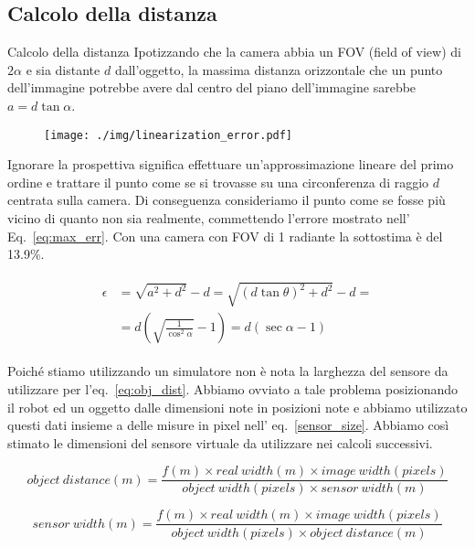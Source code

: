 \documentclass[10pt]{beamer}
\begin{document}
	\subsection{Calcolo della distanza}\label{subsec:Calcolo-della-distanza}
	\begin{frame}[allowframebreaks]{Calcolo della distanza}
		Ipotizzando che la camera abbia un FOV (field of view) di
		$2\alpha$ e sia distante $d$ dall'oggetto, la massima distanza
		orizzontale che un punto dell'immagine potrebbe avere dal centro del
		piano dell'immagine sarebbe $a = d \tan \alpha$.
		
		\begin{figure}[H]
			\centering
			\texttt{[image: ./img/linearization\_error.pdf]}
		\end{figure}
		
		Ignorare la prospettiva significa effettuare un'approssimazione lineare
		del primo ordine e trattare il punto come se si trovasse su una
		circonferenza di raggio $d$ centrata sulla camera. Di conseguenza
		consideriamo il punto come se fosse più vicino di quanto non sia
		realmente, commettendo l'errore mostrato nell' Eq.~\ref{eq:max_err}.
		Con una camera con FOV di 1 radiante la sottostima è del 13.9\%.
		
		\begin{gather}
		\begin{aligned}
		\epsilon &= 
		\sqrt{a^2+d^2} - d =
		\sqrt{(d\tan \theta )^2+d^2}-d =\\
		&=d\left( \sqrt{\frac{1}{\cos ^2 \alpha}}-1 \right) =
		d \left( \sec \alpha -1 \right) 
		\end{aligned}
		\label{eq:max_err}
		\end{gather}
		
		\framebreak
		
		Poiché stiamo utilizzando un simulatore non è nota la larghezza del
		sensore da utilizzare per l'eq.~\ref{eq:obj_dist}. Abbiamo ovviato a
		tale problema posizionando il robot ed un oggetto dalle dimensioni note
		in posizioni note e abbiamo utilizzato questi dati insieme a delle
		misure in pixel nell' eq.~\ref{sensor_size}. Abbiamo così stimato le
		dimensioni del sensore virtuale da utilizzare nei calcoli successivi.
		
		\begin{equation}\label{eq:obj_dist}
		object~distance(m) = 
		\frac{f(m) \times real~width(m) \times image~width(pixels)}
		{object~width(pixels) \times sensor~width(m)}
		\end{equation}
		
		\begin{equation}\label{sensor_size}
		sensor~width(m) = 
		\frac{f(m) \times real~width(m) \times image~width(pixels)}
		{object~width(pixels) \times object~distance(m)}
		\end{equation}

	\end{frame}
	
\end{document}
